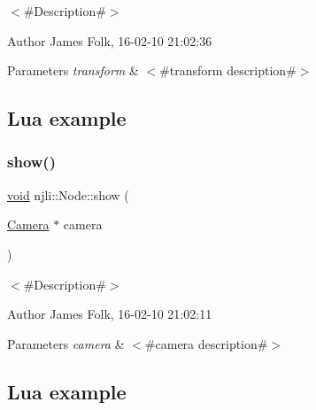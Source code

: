 $<$\#\+Description\#$>$ 

\begin{DoxyAuthor}{Author}
James Folk, 16-\/02-\/10 21\+:02\+:36
\end{DoxyAuthor}

\begin{DoxyParams}{Parameters}
{\em transform} & $<$\#transform description\#$>$\\
\hline
\end{DoxyParams}
\hypertarget{classnjli_1_1_steering_behavior_wander_ex1}{}\subsection{Lua example}\label{classnjli_1_1_steering_behavior_wander_ex1}

\begin{DoxyCodeInclude}
\end{DoxyCodeInclude}
\mbox{\label{classnjli_1_1_node_a53575c84555fe0884f9c8a1db69415f5}} 
\subsubsection{\texorpdfstring{show()}{show()}}
{\footnotesize\ttfamily \mbox{\hyperlink{_thread_8h_af1e856da2e658414cb2456cb6f7ebc66}{void}} njli\+::\+Node\+::show (\begin{DoxyParamCaption}\item[{\mbox{\hyperlink{classnjli_1_1_camera}{Camera}} $\ast$}]{camera }\end{DoxyParamCaption})}



$<$\#\+Description\#$>$ 

\begin{DoxyAuthor}{Author}
James Folk, 16-\/02-\/10 21\+:02\+:11
\end{DoxyAuthor}

\begin{DoxyParams}{Parameters}
{\em camera} & $<$\#camera description\#$>$\\
\hline
\end{DoxyParams}
\hypertarget{classnjli_1_1_steering_behavior_wander_ex1}{}\subsection{Lua example}\label{classnjli_1_1_steering_behavior_wander_ex1}

